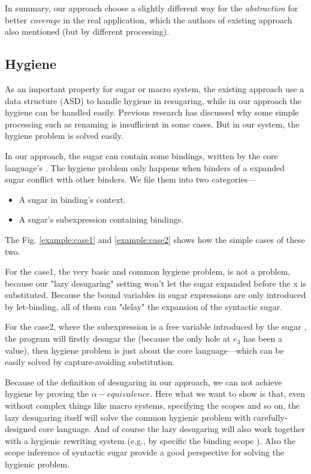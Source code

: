 In summary, our approach choose a slightly different way for the \emph{abstraction} for better \emph{coverage} in the real application, which the authors of existing approach also mentioned (but by different processing). 


\subsection{Hygiene}
\label{mark:hygiene}

As an important property for sugar or macro system, the existing approach use a data structure (ASD) to handle hygiene in resugaring, while in our approach the hygiene can be handled easily. Previous research\cite{EssenceofHygiene} has discussed why some simple processing such as renaming is insufficient in some cases. But in our system, the hygiene problem is solved easily. 

In our approach, the sugar can contain some bindings, written by the core language's . The hygiene problem only happens when binders of a expanded sugar conflict with other binders. We file them into two categories---
\begin{itemize}
\item A sugar in binding's context.
\item A sugar's subexpression containing bindings.
\end{itemize}
The Fig.  \ref{example:case1} and \ref{example:case2} shows how the simple cases of these two.




For the case1, the very basic and common hygiene problem, is not a problem, because our "lazy desugaring" setting won't let the sugar  expanded before the x is substituted. Because the bound variables in sugar expressions are only introduced by let-binding, all of them can "delay" the expansion of the syntactic sugar.

For the case2, where the subexpression  is a free variable introduced by the sugar , the program will firstly desugar the  (because the only hole at $e_3$ has been a value), then hygiene problem is just about the core language---which can be easily solved by capture-avoiding substitution.

Because of the definition of desugaring in our approach, we can not achieve hygiene by proving the $\alpha-equivalence$.
Here what we want to show is that, even without complex things like macro systems, specifying the scopes and so on, the lazy desugaring itself will solve the common hygienic problem with carefully-designed core language. And of course the lazy desugaring will also work together with a hygienic rewriting system (e.g., by specific the binding scope \cite{10.5555/1792878.1792884}). Also the scope inference of syntactic sugar\cite{resugaringscope} provide a good perspective for solving the hygienic problem.
